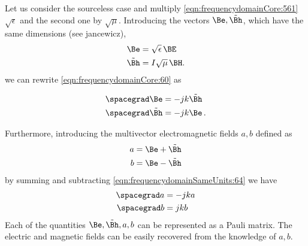 
Let us consider the sourceless case
and multiply
\cref{eqn:frequencydomainCore:561}
$\sqrt{\epsilon}$ and the second one by  $\sqrt{\mu}$. Introducing the vectors
$\Be, \tilde{\Bh}$,
which have the same dimensions (see jancewicz),
%
\begin{dmath}\label{eqn:frequencydomainSameUnits:62}
\begin{aligned}
 \Be     &=  \sqrt{\epsilon} \, \BE\\
\tilde{\Bh} &= I \sqrt{\mu}\,  \BH.
\end{aligned}
\end{dmath}
%
we can rewrite \cref{eqn:frequencydomainCore:60} as

\begin{dmath}\label{eqn:frequencydomainSameUnits:64}
\begin{aligned}
\spacegrad \Be     &= -j k \tilde{\Bh} \\
\spacegrad \tilde{\Bh} &=  - j k \Be \, .
\end{aligned}
\end{dmath}

Furthermore, introducing the multivector electromagnetic fields $a, b$ defined as
%
\begin{dmath}\label{eqn:frequencydomainSameUnits:66}
\begin{aligned}
a &= \Be + \tilde{\Bh} \\
b &= \Be - \tilde{\Bh}
\end{aligned}
\end{dmath}
%
by summing and subtracting \cref{eqn:frequencydomainSameUnits:64} we have
%
\begin{dmath}\label{eqn:frequencydomainSameUnits:68}
\begin{aligned}
\spacegrad a &= - j k a \\
\spacegrad b &=  j k b
\end{aligned}
\end{dmath}
%
Each of the quantities $\Be, \tilde{\Bh}, a, b$ can be represented as a Pauli matrix. The electric and magnetic fields can be easily recovered from the knowledge of $a, b$.

